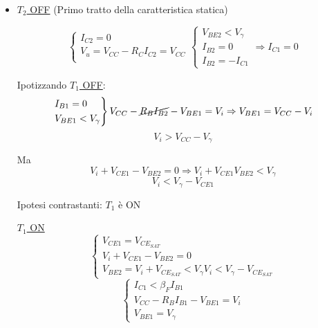 \documentclass{article}
\begin{document}
    \begin{itemize}
        \item \underline{$T_2$ OFF} (Primo tratto della caratteristica statica)

            \[
                \begin{cases}
                    I_{C2} = 0\\
                    V_u = V_{CC} - R_C I_{C2} = V_{CC}\\
                \end{cases}
                \begin{cases}
                    V_{BE2} < V_\gamma\\
                    I_{B2} = 0\\
                    I_{B2} = - I_{C1}
                \end{cases} \Rightarrow I_{C1} = 0
            \]

            Ipotizzando \underline{$T_1$ OFF}:
            \[
                \begin{rcases}
                    I_{B1} = 0\\
                    V_{BE1} < V_\gamma
                \end{rcases} V_{CC} - \cancel{R_B I_{B2}} - V_{BE1} = V_i \Rightarrow V_{BE1} = V_{CC} - V_i
            \]
            \[ V_i > V_{CC} - V_\gamma \]

            Ma
            \[ V_i + V_{CE1} - V_{BE2} = 0 \Rightarrow V_i + V_{CE1} V_{BE2} < V_\gamma \]
            \[ V_i < V_\gamma - V_{CE1} \]

            Ipotesi contrastanti: $T_1$ è ON

            \underline{$T_1$ ON}
            \[
                \begin{cases}
                    V_{CE1} = V_{CE_{SAT}}\\
                    V_i + V_{CE1} - V_{BE2} = 0\\
                    V_{BE2} = V_i + V_{CE_{SAT}} < V_\gamma
                    V_i < V_\gamma - V_{CE_{SAT}}
                \end{cases}
            \]
            \[
                \begin{cases}
                    I_{C1} < \beta_F I_{B1}\\
                    V_{CC} - R_B I_{B1} - V_{BE1} = V_i\\
                    V_{BE1} = V_\gamma
                \end{cases}
            \]


\end{itemize}
\end{document}
